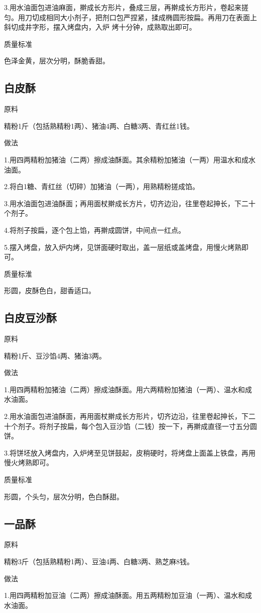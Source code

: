 \documentclass{ctexbook}
\begin{document}
3.用水油面包进油麻面，擀成长方形片，叠成三层，再擀成长方形片，卷起来搓匀。用刀切成相同大小剂子，把剂口包严捏紧，揉成椭圆形按扁。再用刀在表面上斜切成井字形，摆入烤盘内，入炉
烤十分钟，成熟取出即可。

质量标准

色泽金黄，层次分明，酥脆香甜。
\subsection{白皮酥}
原料

精粉1斤（包括熟精粉1两）、猪油4两、白糖3两、青红丝1钱。

做法

1.用四两精粉加猪油（二两）擦成油酥面。其余精粉加猪油（一两）用温水和成水油面。

2.将白1糖、青红丝（切碎）加猪油（一两），用熟精粉搓成馅。

3.用水油面包进油酥面；再用面杖擀成长方片，切齐边沿，往里卷起抻长，下二十个剂子。

4.将剂子按扁，逐个包上馅，再擀成圆饼，中间点一红点。

5.摆入烤盘，放入炉内烤，见饼面硬时取出，盖一层纸或盖烤盘，用慢火烤熟即可。

质量标淮

形圆，皮酥色白，甜香适口。
\subsection{白皮豆沙酥}
原料

精粉1斤、豆沙馅4两、猪油3两。

做法

1.用四两精粉加猪油（二两）擦成油酥面。用六两精粉加猪油（一两）、温水和成水油面。

2.用水油面包进油酥面，再用面杖擀成长方形片，切齐边沿，往里卷起抻长，下二十个剂子。将剂子按扁，每个包入豆沙馅（二钱）按一下，再擀成直径一寸五分圆饼。

3.将饼坯放入烤盘内，入炉烤至见饼鼓起，皮稍硬时，将烤盘上面盖上铁盘，再用慢火烤熟即可。

质量标准

形圆，个头匀，层次分明，色白酥甜。
\subsection{一品酥}
原料

精粉3斤（包括熟精粉1两）、豆油4两、白糖3两、熟芝麻8钱。

做法

1.用四两精粉加豆油（二两）擦成油酥面。用五两精粉加豆油（一两）、温水和成水油面。
\end{document}
